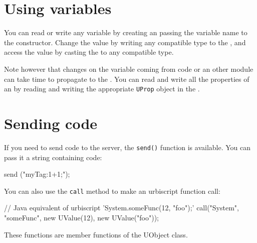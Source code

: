 \section{Using \urbi variables}
\label{sec:uob:apijava:uvar}

You can read or write any \urbi variable by creating an
\UVar passing the variable name to the constructor. Change
the value by writing any compatible type to the \UVar, and
access the value by casting the \UVar to any compatible
type.

Note however that changes on the
variable coming from \urbi code or an other module can take time to propagate
to the \UVar.
You can read and write all the \urbi properties of an \UVar by
reading and writing the appropriate \lstinline{UProp} object in the
\UVar.

\section{Sending \urbi code}
\label{sec:uob:apijava:sendcode}

If you need to send \urbi code to the server, the \lstinline{send()} function
is available. You can pass it a string containing \urbi code:

\begin{urbiunchecked}
send ("myTag:1+1;");
\end{urbiunchecked}

You can also use the \lstinline{call} method to make an urbiscript function
call:

\begin{urbiunchecked}
// Java equivalent of urbiscript 'System.someFunc(12, "foo");'
call("System", "someFunc", new UValue(12), new UValue("foo"));
\end{urbiunchecked}

These functions are member functions of the UObject class.


